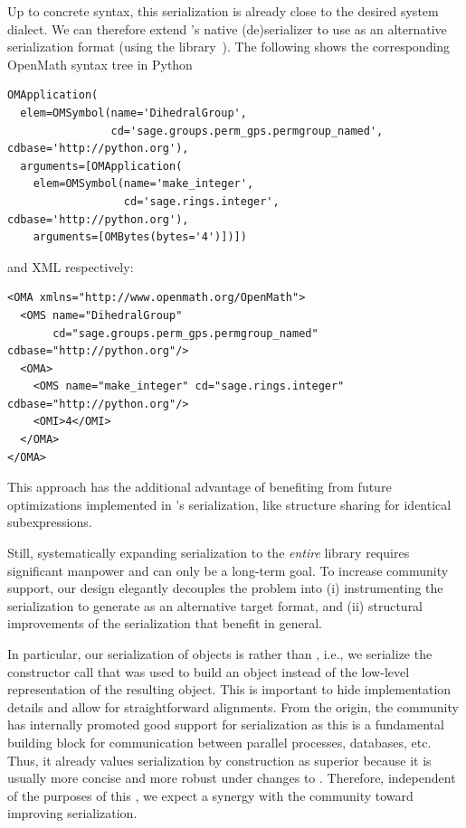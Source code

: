 Up to concrete syntax, this serialization is already close to the desired \Sage system dialect.
We can therefore extend \Python's native (de)serializer to use \OMMT as an alternative serialization format (using the \Python library~\cite{py-openmath:on}).
The following shows the corresponding OpenMath syntax tree in Python
\begin{lstlisting}[basicstyle=\sf\small,label=lst:sagedihedral:om,caption={The dihedral group $D_4$ in OpenMath Syntax}]
OMApplication(
  elem=OMSymbol(name='DihedralGroup',
                cd='sage.groups.perm_gps.permgroup_named', cdbase='http://python.org'),
  arguments=[OMApplication(
    elem=OMSymbol(name='make_integer',
                  cd='sage.rings.integer', cdbase='http://python.org'),
    arguments=[OMBytes(bytes='4')])])
\end{lstlisting}
 and XML respectively:
\begin{lstlisting}[basicstyle=\sf\small,label=lst:sagedihedral:xml,caption={The dihedral group $D_4$ in XML Format}]
<OMA xmlns="http://www.openmath.org/OpenMath">
  <OMS name="DihedralGroup"
       cd="sage.groups.perm_gps.permgroup_named" cdbase="http://python.org"/>
  <OMA>
    <OMS name="make_integer" cd="sage.rings.integer" cdbase="http://python.org"/>
    <OMI>4</OMI>
  </OMA>
</OMA>
\end{lstlisting}
This approach has the additional advantage of benefiting from future optimizations implemented in \Python's serialization, like structure sharing for identical subexpressions.




Still, systematically expanding \OMMT serialization to the \emph{entire} \Sage library requires significant manpower and can only be a long-term goal.
To increase community support, our design elegantly decouples the problem into (i) instrumenting the serialization to generate \OMMT as an alternative target format, and (ii) structural improvements of the serialization that benefit \Sage in general.

In particular, our serialization of \Sage objects is  rather than , i.e., we serialize the constructor call that was used to build an object instead of the low-level \Python representation of the resulting object.
This is important to hide implementation details and allow for straightforward alignments.
From the origin, the \Sage community has internally promoted
good support for serialization as this is a fundamental building
block for communication between parallel processes, databases, etc.
Thus, it already values serialization by construction as
superior because it is usually more concise and more robust under
changes to \Sage. Therefore, independent of the purposes of this
\papertype, we expect a synergy with the \Sage community toward improving
serialization.

